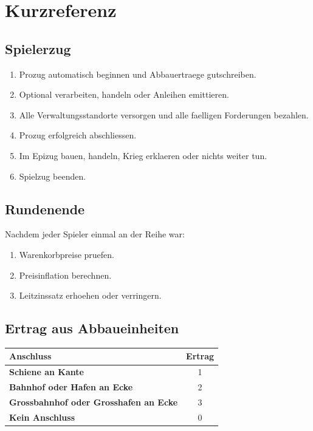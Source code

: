 \documentclass[11pt,a4paper,oneside,parskip=half]{scrreprt}
\begin{document}
\appendix

\chapter{Kurzreferenz}

\section{Spielerzug}
\begin{enumerate}
  \item Prozug automatisch beginnen und Abbauertraege gutschreiben.
  \item Optional verarbeiten, handeln oder Anleihen emittieren.
  \item Alle Verwaltungsstandorte versorgen und alle faelligen Forderungen bezahlen.
  \item Prozug erfolgreich abschliessen.
  \item Im Epizug bauen, handeln, Krieg erklaeren oder nichts weiter tun.
  \item Spielzug beenden.
\end{enumerate}

\section{Rundenende}
Nachdem jeder Spieler einmal an der Reihe war:
\begin{enumerate}
  \item Warenkorbpreise pruefen.
  \item Preisinflation berechnen.
  \item Leitzinssatz erhoehen oder verringern.
\end{enumerate}

\section{Ertrag aus Abbaueinheiten}
\begin{center}
\begin{tabular}{>{\bfseries}l c}
\toprule
Anschluss & Ertrag \\
\midrule
Schiene an Kante & 1 \\
Bahnhof oder Hafen an Ecke & 2 \\
Grossbahnhof oder Grosshafen an Ecke & 3 \\
Kein Anschluss & 0 \\
\bottomrule
\end{tabular}
\end{center}
\end{document}
